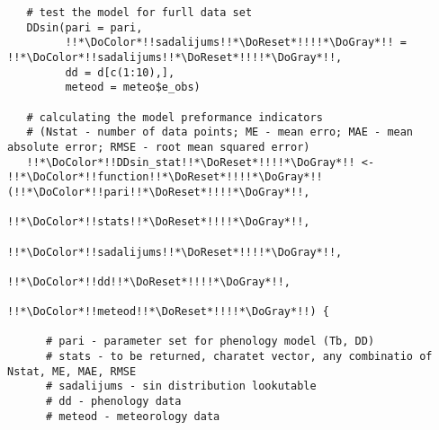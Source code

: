 \begin{verbatim}
   # test the model for furll data set
   DDsin(pari = pari,
         !!*\DoColor*!!sadalijums!!*\DoReset*!!!!*\DoGray*!! = !!*\DoColor*!!sadalijums!!*\DoReset*!!!!*\DoGray*!!,
         dd = d[c(1:10),],
         meteod = meteo$e_obs)

   # calculating the model preformance indicators
   # (Nstat - number of data points; ME - mean erro; MAE - mean absolute error; RMSE - root mean squared error)
   !!*\DoColor*!!DDsin_stat!!*\DoReset*!!!!*\DoGray*!! <- !!*\DoColor*!!function!!*\DoReset*!!!!*\DoGray*!!(!!*\DoColor*!!pari!!*\DoReset*!!!!*\DoGray*!!,
                           !!*\DoColor*!!stats!!*\DoReset*!!!!*\DoGray*!!,
                           !!*\DoColor*!!sadalijums!!*\DoReset*!!!!*\DoGray*!!,
                           !!*\DoColor*!!dd!!*\DoReset*!!!!*\DoGray*!!,
                           !!*\DoColor*!!meteod!!*\DoReset*!!!!*\DoGray*!!) {

      # pari - parameter set for phenology model (Tb, DD)
      # stats - to be returned, charatet vector, any combinatio of Nstat, ME, MAE, RMSE
      # sadalijums - sin distribution lookutable
      # dd - phenology data
      # meteod - meteorology data


\end{verbatim}
